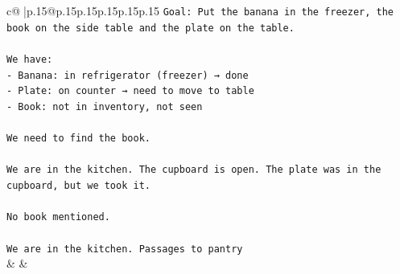 \documentclass{article}
\begin{document}
{\begin{supertabular}{c@{$\;$}|p{.15\linewidth}@{}p{.15\linewidth}p{.15\linewidth}p{.15\linewidth}p{.15\linewidth}p{.15\linewidth}}
{{{\texttt{Goal: Put the banana in the freezer, the book on the side table and the plate on the table.} \\
\\ 
\texttt{We have:} \\
\texttt{{-} Banana: in refrigerator (freezer) → done} \\
\texttt{{-} Plate: on counter → need to move to table} \\
\texttt{{-} Book: not in inventory, not seen} \\
\\ 
\texttt{We need to find the book.} \\
\\ 
\texttt{We are in the kitchen. The cupboard is open. The plate was in the cupboard, but we took it.} \\
\\ 
\texttt{No book mentioned.} \\
\\ 
\texttt{We are in the kitchen. Passages to pantry} \\
            }
        }
    }
    & & \\ \\


\end{supertabular}}
\end{document}
